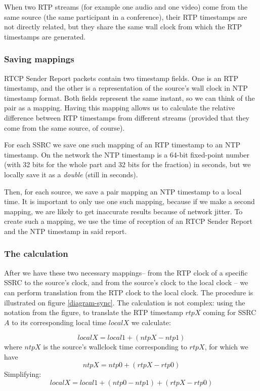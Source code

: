 \documentclass[twoside,openright,a4paper,12pt,english]{article}
\begin{document}
When two RTP streams (for example one audio and one video) come from the same source
(the same participant in a conference), their RTP timestamps are not directly related,
but they share the same wall clock from which the RTP timestamps are generated.

\subsubsection{Saving mappings}
RTCP Sender Report packets contain two timestamp fields. One is an RTP timestamp, and the
other is a representation of the source's wall clock in NTP timestamp format\cite{ntp}. Both fields
represent the same instant, so we can think of the pair as a mapping. Having this mapping allows us to
calculate the relative difference between RTP timestamps from different streams
(provided that they come from the same source, of course).

\medskip
For each SSRC we save one such mapping of an RTP timestamp to an NTP timestamp.
On the network the NTP timestamp is a 64-bit fixed-point number (with 32 bits
for the whole part and 32 bits for the fraction) in seconds, but we locally
save it as a \emph{double} (still in seconds).

Then, for each source, we save a pair mapping an NTP timestamp to a local time.
It is important to only use one such mapping, because if we make
a second mapping, we are likely to get inaccurate results because of
network jitter. To create such a mapping, we use the time of reception of an RTCP
Sender Report and the NTP timestamp in said report.

\subsubsection{The calculation}
After we have these two necessary mappings-- from the RTP clock of a specific
SSRC to the source's clock, and from the source's clock to the local clock -- we
can perform translation from the RTP clock to the local clock. The procedure is
illustrated on figure \ref{diagram-sync}. The calculation is not complex: using the
notation from the figure, to translate the RTP timestamp $rtpX$ coming for
SSRC $A$ to its corresponding local time $localX$ we calculate:

$$localX = local1 + (ntpX - ntp1)$$ 
where $ntpX$ is the source's wallclock time corresponding to $rtpX$, for which we have
$$ntpX = ntp0 + (rtpX - rtp0)$$
Simplifying: $$localX = local1 + (ntp0 - ntp1) + (rtpX - rtp0)$$
\end{document}

